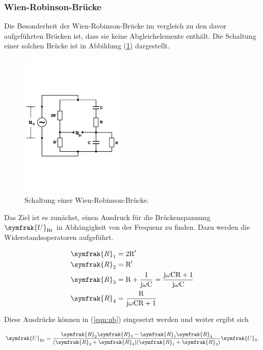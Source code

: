 \newpage
\subsubsection{Wien-Robinson-Brücke}

\noindent
Die Besonderheit der Wien-Robinson-Brücke im vergleich zu den davor aufgeführten Brücken ist, dass sie keine Abgleichelemente enthält.
Die Schaltung einer solchen Brücke ist in Abbildung (\ref{fig:wien}) dargestellt.

\begin{figure}
            \centering
               \includegraphics[height=7cm]{Bilder/wien.pdf}
               \caption{Schaltung einer Wien-Robinson-Brücke.}
               \label{fig:wien}
        \end{figure}

\noindent
Das Ziel ist es zunächst, einen Ausdruck für die Brückenspannung $\symfrak{U}_\text{Br}$ in Abhängigkeit von der Frequenz zu finden.
Dazu werden die Widerstandsoperatoren aufgeführt.

\begin{align*}
\symfrak{R}_1 &= 2\text{R}' \\
\symfrak{R}_2 &= \text{R}' \\
\symfrak{R}_3 &= \text{R} + \frac{1}{\text{j} \omega \text{C}} = \frac{\text{j} \omega \text{C} \text{R} + 1}{\text{j} \omega \text{C}} \\
\symfrak{R}_4 &= \frac{\text{R}}{\text{j} \omega \text{C} \text{R} + 1}
\end{align*}

\noindent
Diese Ausdrücke können in (\ref{eqn:ub}) eingesetzt werden und weiter ergibt sich

\begin{equation}
\symfrak{U}_\text{Br} = \frac{\symfrak{R}_2 \symfrak{R}_3 - \symfrak{R}_1 \symfrak{R}_4}{(\symfrak{R}_3 + \symfrak{R}_4)(\symfrak{R}_1 + \symfrak{R}_2)} \symfrak{U}_\text{S}  .
\end{equation}

